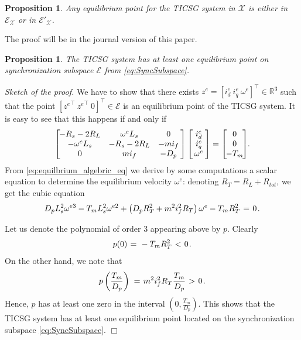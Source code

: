 \documentclass{ifacconf}
\newtheorem{proposition}[theorem]{Proposition}
\newcommand{\rline}  {{\mathbb R}}
\renewcommand{\o}    {{\omega}}
\newcommand{\m}      {{\hbox{\hskip 1pt}}}
\newcommand{\nm}     {{\hbox{\hskip -3pt}}}
\newcommand{\Emscr}  {{\mathcal{E}}}
\newcommand{\Xmscr}  {{\mathcal{X}}}
\begin{document}
\begin{proposition} \label{EqPointsProp1}
Any equilibrium point for the TICSG system in $\Xmscr$ is either in
$\Emscr_\Xmscr$ or in $\Emscr'_\Xmscr$.
\end{proposition}

The proof will be in the journal version of this paper.

\medskip
\begin{proposition} \label{EqPointsProp2}
The TICSG system has at least one equilibrium point on
synchronization subspace $\Emscr$ from \eqref{eq:SyncSubspace}.
\end{proposition}

{\em Sketch of the proof.} \m
We have to show that there exists $z^e=[i_d^e\ i_q^e\ \o^e]^\top\in
\rline^3$ such that the point $[{z^e}^\top\ {z^e}^\top\ 0]^\top\in
\Emscr$ is an equilibrium point of the TICSG system. It is easy to 
see that this happens if and only if
\begin{equation} \label{eq:equilbrium_algebric_eq}
   \left[\nm\nm\begin{array}{ccc} -R_s-2R_L & \o^e L_s & 0\\
   -\o^e L_s & -R_s-2R_L & -m i_f\\ 0 & m i_f & -D_p
   \end{array} \nm\right] \left[\nm\begin{array}{c} i_d^e\\
   i_q^e\\ \o^e \end{array} \nm\right] = \left[\nm\nm 
   \begin{array}{c} 0\\ 0\\ -T_m\end{array} \nm\nm\right]\nm\m.
\end{equation}
From \eqref{eq:equilbrium_algebric_eq} we derive by some computations
a scalar equation to determine the equilibrium velocity $\o^e$:
denoting $R_T=R_L+R_{tot}$, we get the cubic equation
$$ D_p L_s^2\o^{e3}-T_m L_s^2 \o^{e2} +\left(D_p R_T^2+m^2 i_f^2 
   R_T\right) \o^e - T_m R_T^2 \m=\m 0 \m.$$

Let us denote the polynomial of order 3 appearing above by $p$. 
Clearly \vspace{-2mm}
$$p(0) \m=\m -T_m R_T^2 \m<\m 0 \m.$$
On the other hand, we note that 
$$ p\left(\frac{T_m}{D_p}\right) \m=\m m^2 i_f^2 R_T\frac{T_m}{D_p} 
   \m>\m 0 \m.$$
Hence, $p$ has at least one zero in the interval $\left(0,
\frac{T_m}{D_p}\right)$. This shows that the TICSG system has at least
one equilibrium point located on the synchronization subspace 
\eqref{eq:SyncSubspace}. \m $\Box$
\end{document}
